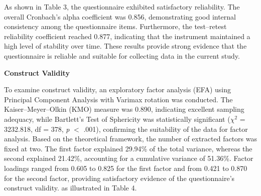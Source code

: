 \documentclass[10pt]{NSP1}
\begin{document}
	As shown in Table 3, the questionnaire exhibited satisfactory reliability. The overall Cronbach's alpha coefficient was 0.856, demonstrating good internal consistency among the questionnaire items. Furthermore, the test–retest reliability coefficient reached 0.877, indicating that the instrument maintained a high level of stability over time. These results provide strong evidence that the questionnaire is reliable and suitable for collecting data in the current study.
	
	\noindent\textbf{Construct Validity}
	
	To examine construct validity, an exploratory factor analysis (EFA) using Principal Component Analysis with Varimax rotation was conducted. The Kaiser–Meyer–Olkin (KMO) measure was 0.890, indicating excellent sampling adequacy, while Bartlett's Test of Sphericity was statistically significant ($\chi^{2}$ = 3232.818, df = 378, \textit{p} $<$ .001), confirming the suitability of the data for factor analysis. Based on the theoretical framework, the number of extracted factors was fixed at two. The first factor explained 29.94\% of the total variance, whereas the second explained 21.42\%, accounting for a cumulative variance of 51.36\%. Factor loadings ranged from 0.605 to 0.825 for the first factor and from 0.421 to 0.870 for the second factor, providing satisfactory evidence of the questionnaire's construct validity. as illustrated in Table 4.
	
\end{document}
